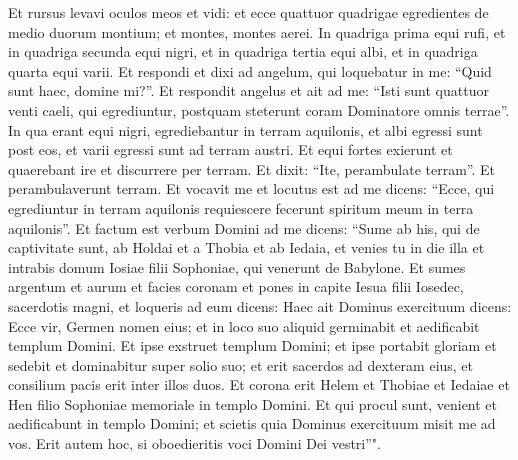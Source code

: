 \begin{biblechapter}  
\verse Et rursus levavi oculos meos et vidi: et ecce quattuor quadrigae egredientes de medio duorum montium; et montes, montes aerei. 
\verse In quadriga prima equi rufi, et in quadriga secunda equi nigri, 
\verse et in quadriga tertia equi albi, et in quadriga quarta equi varii. 
\verse Et respondi et dixi ad angelum, qui loquebatur in me: “Quid sunt haec, domine mi?”. 
\verse Et respondit angelus et ait ad me: “Isti sunt quattuor venti caeli, qui egrediuntur, postquam steterunt coram Dominatore omnis terrae”. 
\verse In qua erant equi nigri, egrediebantur in terram aquilonis, et albi egressi sunt post eos, et varii egressi sunt ad terram austri. 
\verse Et equi fortes exierunt et quaerebant ire et discurrere per terram. Et dixit: “Ite, perambulate terram”. Et perambulaverunt terram. 
\verse Et vocavit me et locutus est ad me dicens: “Ecce, qui egrediuntur in terram aquilonis requiescere fecerunt spiritum meum in terra aquilonis”. 
\verse Et factum est verbum Domini ad me dicens: 
\verse “Sume ab his, qui de captivitate sunt, ab Holdai et a Thobia et ab Iedaia, et venies tu in die illa et intrabis domum Iosiae filii Sophoniae, qui venerunt de Babylone. 
\verse Et sumes argentum et aurum et facies coronam et pones in capite Iesua filii Iosedec, sacerdotis magni, 
\verse et loqueris ad eum dicens: Haec ait Dominus exercituum dicens: Ecce vir, Germen nomen eius; et in loco suo aliquid germinabit et aedificabit templum Domini. 
\verse Et ipse exstruet templum Domini; et ipse portabit gloriam et sedebit et dominabitur super solio suo; et erit sacerdos ad dexteram eius, et consilium pacis erit inter illos duos. 
\verse Et corona erit Helem et Thobiae et Iedaiae et Hen filio Sophoniae memoriale in templo Domini. 
\verse Et qui procul sunt, venient et aedificabunt in templo Domini; et scietis quia Dominus exercituum misit me ad vos. Erit autem hoc, si oboedieritis voci Domini Dei vestri”". 
\end{biblechapter}

